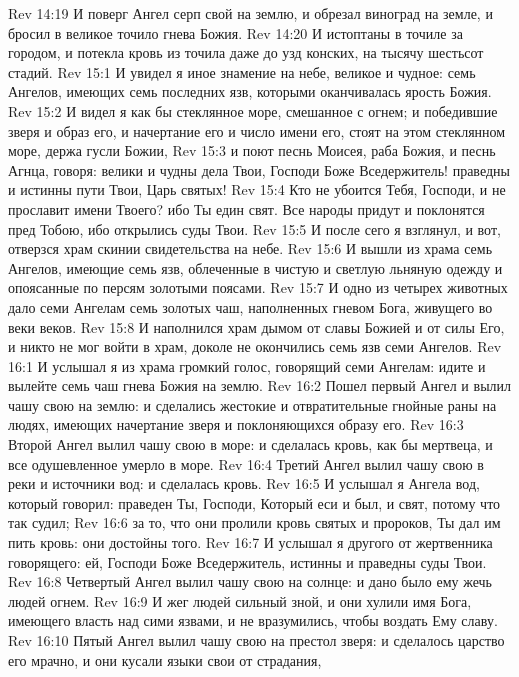 \vs Rev 14:19 И поверг Ангел серп свой на землю, и обрезал виноград на земле, и бросил в великое точило гнева Божия.
\vs Rev 14:20 И истоптаны  в точиле за городом, и потекла кровь из точила даже до узд конских, на тысячу шестьсот стадий.
\vs Rev 15:1 И увидел я иное знамение на небе, великое и чудное: семь Ангелов, имеющих семь последних язв, которыми оканчивалась ярость Божия.
\vs Rev 15:2 И видел я как бы стеклянное море, смешанное с огнем; и победившие зверя и образ его, и начертание его и число имени его, стоят на этом стеклянном море, держа гусли Божии,
\vs Rev 15:3 и поют песнь Моисея, раба Божия, и песнь Агнца, говоря: велики и чудны дела Твои, Господи Боже Вседержитель! праведны и истинны пути Твои, Царь святых!
\vs Rev 15:4 Кто не убоится Тебя, Господи, и не прославит имени Твоего? ибо Ты един свят. Все народы придут и поклонятся пред Тобою, ибо открылись суды Твои.
\rsbpar\vs Rev 15:5 И после сего я взглянул, и вот, отверзся храм скинии свидетельства на небе.
\vs Rev 15:6 И вышли из храма семь Ангелов, имеющие семь язв, облеченные в чистую и светлую льняную одежду и опоясанные по персям золотыми поясами.
\vs Rev 15:7 И одно из четырех животных дало семи Ангелам семь золотых чаш, наполненных гневом Бога, живущего во веки веков.
\vs Rev 15:8 И наполнился храм дымом от славы Божией и от силы Его, и никто не мог войти в храм, доколе не окончились семь язв семи Ангелов.
\vs Rev 16:1 И услышал я из храма громкий голос, говорящий семи Ангелам: идите и вылейте семь чаш гнева Божия на землю.
\vs Rev 16:2 Пошел первый Ангел и вылил чашу свою на землю: и сделались жестокие и отвратительные гнойные раны на людях, имеющих начертание зверя и поклоняющихся образу его.
\rsbpar\vs Rev 16:3 Второй Ангел вылил чашу свою в море: и сделалась кровь, как бы мертвеца, и все одушевленное умерло в море.
\rsbpar\vs Rev 16:4 Третий Ангел вылил чашу свою в реки и источники вод: и сделалась кровь.
\vs Rev 16:5 И услышал я Ангела вод, который говорил: праведен Ты, Господи, Который еси и был, и свят, потому что так судил;
\vs Rev 16:6 за то, что они пролили кровь святых и пророков, Ты дал им пить кровь: они достойны того.
\vs Rev 16:7 И услышал я другого от жертвенника говорящего: ей, Господи Боже Вседержитель, истинны и праведны суды Твои.
\rsbpar\vs Rev 16:8 Четвертый Ангел вылил чашу свою на солнце: и дано было ему жечь людей огнем.
\vs Rev 16:9 И жег людей сильный зной, и они хулили имя Бога, имеющего власть над сими язвами, и не вразумились, чтобы воздать Ему славу.
\rsbpar\vs Rev 16:10 Пятый Ангел вылил чашу свою на престол зверя: и сделалось царство его мрачно, и они кусали языки свои от страдания,
